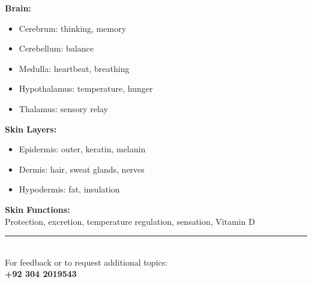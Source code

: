 \documentclass[12pt]{article}
\begin{document}
\vspace{10pt}

\begin{tcolorbox}[enhanced, arc=4pt, boxrule=1.5pt,
  colback=amberbg, colframe=amberclr,
  left=10pt, right=10pt, top=8pt, bottom=8pt,
  title={\small\bfseries\color{white} Brain Parts \& Skin Layers},
  colbacktitle=amberclr, coltitle=white,
  attach boxed title to top left={xshift=10pt, yshift=-\tcboxedtitleheight/2},
  boxed title style={arc=3pt, colframe=amberclr, boxrule=0pt}]
\begin{multicols}{2}
\textbf{Brain:}
\begin{itemize}[leftmargin=12pt, itemsep=1pt]
  \item Cerebrum: thinking, memory
  \item Cerebellum: balance
  \item Medulla: heartbeat, breathing
  \item Hypothalamus: temperature, hunger
  \item Thalamus: sensory relay
\end{itemize}
\columnbreak
\textbf{Skin Layers:}
\begin{itemize}[leftmargin=12pt, itemsep=1pt]
  \item Epidermis: outer, keratin, melanin
  \item Dermis: hair, sweat glands, nerves
  \item Hypodermis: fat, insulation
\end{itemize}
\textbf{Skin Functions:}\\
Protection, excretion, temperature regulation, sensation, Vitamin D
\end{multicols}
\end{tcolorbox}

\vspace{20pt}
\begin{center}
  \color{grayclr}\rule{0.6\linewidth}{0.4pt}\\[8pt]
  {\small\color{darktext} For feedback or to request additional topics:}\\[4pt]
  {\normalsize\bfseries\color{primary} +92 304 2019543}
\end{center}
\end{document}
